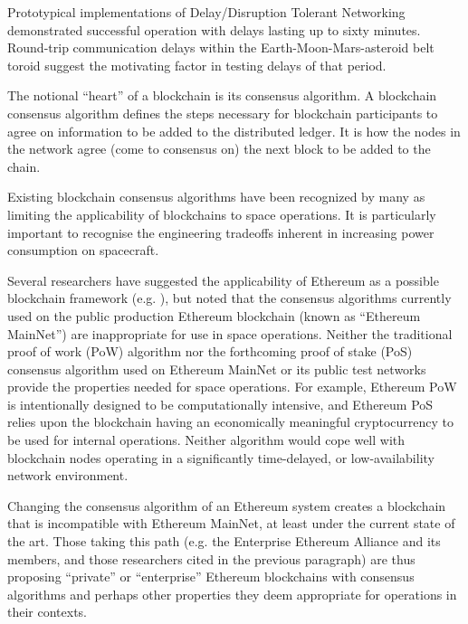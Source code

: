 \documentclass[journal ]{new-aiaa}
\begin{document}
Prototypical implementations of Delay/Disruption Tolerant Networking demonstrated successful operation with delays lasting up to sixty minutes. Round-trip communication delays within the Earth-Moon-Mars-asteroid belt toroid suggest the motivating factor in testing delays of that period.

The notional ``heart'' of a blockchain is its consensus algorithm. A blockchain consensus algorithm defines the steps necessary for blockchain participants to agree on information to be added to the distributed ledger. It is how the nodes in the network agree (come to consensus on) the next block to be added to the chain\cite{hyland-wood_future_2018}.

Existing blockchain consensus algorithms have been recognized by many as limiting the applicability of blockchains to space operations\cite{yu_blockchain_2019,yu_situational_2019,mandl_bitcoin_2017,molesky_blockchain_2018,xu_exploration_2019}. It is particularly important to recognise the engineering tradeoffs inherent in increasing power consumption on spacecraft\cite{lyke_energy_2017}.

Several researchers have suggested the applicability of Ethereum as a possible blockchain framework (e.g. \cite{israel_space_2019}), but noted that the consensus algorithms currently used on the public production Ethereum blockchain (known as ``Ethereum MainNet'') are inappropriate for use in space operations\cite{molesky_blockchain_2018,xu_exploration_2019,mital_blockchain_2019}. Neither the traditional proof of work (PoW) algorithm nor the forthcoming proof of stake (PoS) consensus algorithm used on Ethereum MainNet or its public test networks provide the properties needed for space operations. For example, Ethereum PoW is intentionally designed to be computationally intensive, and Ethereum PoS relies upon the blockchain having an economically meaningful cryptocurrency to be used for internal operations. Neither algorithm would cope well with blockchain nodes operating in a significantly time-delayed, or low-availability network environment.

Changing the consensus algorithm of an Ethereum system creates a blockchain that is incompatible with Ethereum MainNet, at least under the current state of the art. Those taking this path (e.g. the Enterprise Ethereum Alliance and its members, and those researchers cited in the previous paragraph) are thus proposing ``private'' or ``enterprise'' Ethereum blockchains with consensus algorithms and perhaps other properties they deem appropriate for operations in their contexts.
\end{document}
